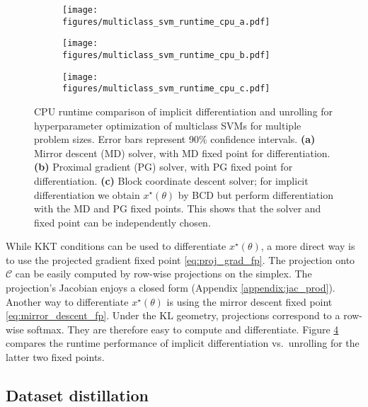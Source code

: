 \documentclass{article}
\def\cC{{\mathcal{C}}}
\begin{document}
\begin{figure}[t]
\begin{subfigure}{.33\textwidth}
  \centering
  \texttt{[image: figures/multiclass\_svm\_runtime\_cpu\_a.pdf]}
  \caption{}
  \label{fig:multiclass_svm_runtime_cpu_a}
\end{subfigure}
\begin{subfigure}{.33\textwidth}
  \centering
  \texttt{[image: figures/multiclass\_svm\_runtime\_cpu\_b.pdf]}
  \caption{}
  \label{fig:multiclass_svm_runtime_cpu_b}
\end{subfigure}
\begin{subfigure}{.33\textwidth}
  \centering
  \texttt{[image: figures/multiclass\_svm\_runtime\_cpu\_c.pdf]}
  \caption{}
  \label{fig:multiclass_svm_runtime_cpu_c}
\end{subfigure}
\caption{CPU runtime comparison of implicit differentiation and unrolling for
hyperparameter optimization of multiclass SVMs for multiple problem sizes. Error
bars represent 90\% confidence
intervals. {\bf (a)} Mirror descent (MD) solver, with MD fixed point for
differentiation. {\bf (b)} Proximal gradient (PG) solver, with PG
fixed point for differentiation. {\bf (c)} Block coordinate
descent solver;
for implicit differentiation we obtain $x^\star(\theta)$ by BCD
but perform differentiation with the MD 
and PG fixed points. This
shows that the solver and fixed point can be independently chosen. }
\label{fig:multiclass_svm_runtime_cpu}
\end{figure}

While KKT conditions can be used to differentiate $x^\star(\theta)$, a more
direct way is to use the projected gradient fixed point \eqref{eq:proj_grad_fp}.
The projection onto $\cC$ can be easily computed by row-wise projections on the
simplex. The projection's Jacobian enjoys a closed form (Appendix
\ref{appendix:jac_prod}).  Another way to differentiate $x^\star(\theta)$
is using the mirror descent fixed point \eqref{eq:mirror_descent_fp}.  Under the
KL geometry, projections correspond to a row-wise softmax.
They are therefore easy to compute and differentiate.  Figure
\ref{fig:multiclass_svm_runtime_cpu} compares the runtime performance of
implicit differentiation vs.\ unrolling for the latter two fixed points.

\subsection{Dataset distillation}
\label{sec:distillation}
\end{document}
